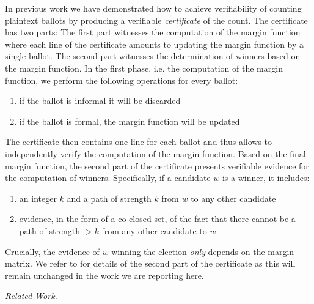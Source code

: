 \documentclass{llncs}
\begin{document}
  In previous work \cite{Pattinson:2017:SVE} we have demonstrated
  how to achieve verifiability of counting plaintext ballots by
  producing a verifiable \emph{certificate} of the count. The
  certificate has two parts: The first part witnesses the
  computation of the margin function where each line of the
  certificate amounts to updating the margin function by a single
  ballot. The second part witnesses the determination of winners
  based on the margin function. In the first phase, i.e. the
  computation of the margin function, we perform the following
  operations for every ballot:
  \begin{enumerate}
    \item if the ballot is informal it will be discarded
    \item if the ballot is formal, the margin function will be
    updated
  \end{enumerate}
  The certificate then contains one line for each ballot and thus
  allows to independently verify the computation of the margin
  function. Based on the final margin function, the second part of
  the certificate presents verifiable evidence for the computation
  of winners. Specifically, if a candidate $w$ is a winner, it
  includes:
  \begin{enumerate}
    \item an integer $k$ and a path of strength $k$ from $w$ to any
    other candidate
    \item evidence, in the form of a co-closed set, of the fact that
    there cannot be a path of strength $> k$ from any other
    candidate to $w$.
  \end{enumerate}
  Crucially, the evidence of $w$ winning the election \emph{only}
  depends on the margin matrix. 
  We refer to \cite{Pattinson:2017:SVE} for details of the second
  part of the certificate as this will remain unchanged in the work
  we are reporting here.
    
  \smallskip\emph{Related Work.} 
\end{document}
